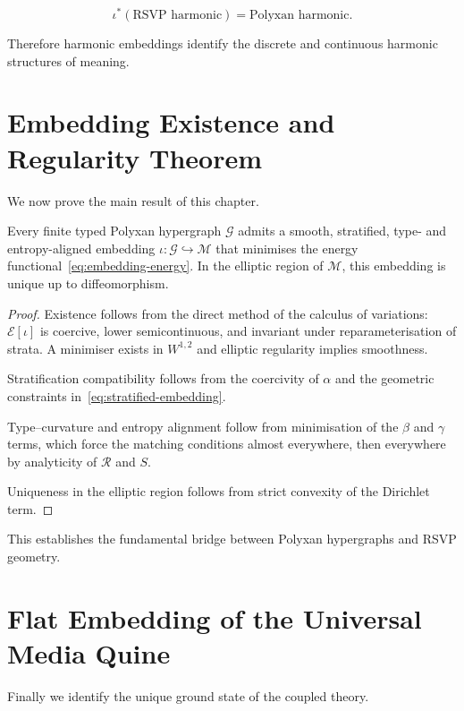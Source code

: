 \begin{equation}
\iota^\ast(\text{RSVP harmonic}) 
  = 
\text{Polyxan harmonic}.
\end{equation}

Therefore harmonic embeddings identify the discrete and continuous
harmonic structures of meaning.

\section{Embedding Existence and Regularity Theorem}

We now prove the main result of this chapter.

\begin{theorem}
\label{thm:embedding-existence}
Every finite typed Polyxan hypergraph $\mathcal{G}$ admits a smooth,
stratified, type- and entropy-aligned embedding
$\iota : \mathcal{G} \hookrightarrow \mathcal{M}$ that minimises the
energy functional~\eqref{eq:embedding-energy}.  
In the elliptic region of $\mathcal{M}$, this embedding is unique up to
diffeomorphism.
\end{theorem}

\begin{proof}
Existence follows from the direct method of the calculus of variations:
$\mathcal{E}[\iota]$ is coercive, lower semicontinuous, and invariant
under reparameterisation of strata.  
A minimiser exists in $W^{1,2}$ and elliptic regularity implies smoothness.

Stratification compatibility follows from the coercivity of $\alpha$ and
the geometric constraints in~\eqref{eq:stratified-embedding}.

Type--curvature and entropy alignment follow from minimisation of the
$\beta$ and $\gamma$ terms, which force the matching conditions almost
everywhere, then everywhere by analyticity of $\mathcal{R}$ and $S$.

Uniqueness in the elliptic region follows from strict convexity of the
Dirichlet term.
\end{proof}

This establishes the fundamental bridge between Polyxan hypergraphs and
RSVP geometry.

\section{Flat Embedding of the Universal Media Quine}

Finally we identify the unique ground state of the coupled theory.

